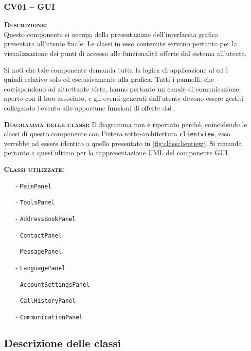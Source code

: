 \subsubsection{CV01 -- GUI}\label{sec:gui}
\begin{description}
	\item{\scshape\bfseries Descrizione:}\\
Questo componente si occupa della presentazione dell'interfaccia grafica presentata all'utente finale. Le classi in esso contenute servono pertanto per la visualizzazione dei punti di accesso alle funzionalità offerte dal sistema all'utente.

Si noti che tale componente demanda tutta la logica di applicazione al  ed è quindi relativo solo ed esclusivamente alla grafica. Tutti i pannelli, che corrispondono ad altrettante viste, hanno pertanto un canale di comunicazione aperto con il  loro associato, e gli eventi generati dall'utente devono essere gestiti collegando l'evento alle opportune funzioni di  offerte dai .

	\item{\scshape\bfseries Diagramma delle classi:}
Il diagramma non è riportato perché, coincidendo le classi di questo componente con l'intera sotto-architettura \texttt{clientview}, esso verrebbe ad essere identico a quello presentato in \vref{fig:classclientiew}. Si rimanda pertanto a quest'ultimo per la rappresentazione UML del componente GUI\@.
	
	\item{\scshape\bfseries Classi utilizzate:} 
	\begin{itemize}[noitemsep,nolistsep]
		\item[-] \texttt{MainPanel}
		\item[-] \texttt{ToolsPanel}
		\item[-] \texttt{AddressBookPanel}
		\item[-] \texttt{ContactPanel}
		\item[-] \texttt{MessagePanel}
		\item[-] \texttt{LanguagePanel}
		\item[-] \texttt{AccountSettingsPanel}
		\item[-] \texttt{CallHistoryPanel}
		\item[-] \texttt{CommunicationPanel}
	\end{itemize}  
\end{description}

\subsection{Descrizione delle classi}


